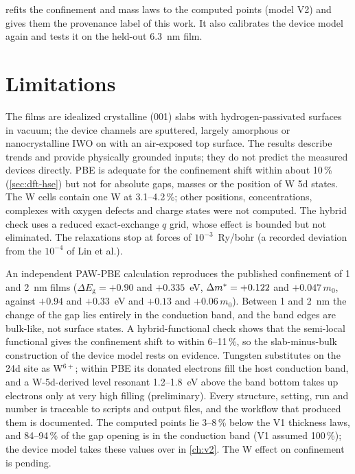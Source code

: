  refits the confinement and mass laws to the computed points (model V2) and gives them the provenance label
of this work. It also calibrates the device model again and tests it on the held-out 6.3~nm film.

\section{Limitations}
\label{sec:dft-limits}

\begin{caveat}
The films are idealized crystalline (001) slabs with hydrogen-passivated surfaces in vacuum; the device channels are
sputtered, largely amorphous or nanocrystalline IWO on \AlO{} with an air-exposed top surface. The results describe
trends and provide physically grounded inputs; they do not predict the measured devices directly. PBE is adequate for
the confinement shift within about 10\,\% (\cref{sec:dft-hse}) but not for absolute gaps, masses or the position of W 5d
states. The W cells contain one W at 3.1--4.2\,\%; other positions, concentrations, complexes with oxygen defects and
charge states were not computed. The hybrid check uses a reduced exact-exchange $q$ grid, whose effect is bounded but
not eliminated. The relaxations stop at forces of $10^{-3}$~Ry/bohr (a recorded deviation from the $10^{-4}$ of Lin et
al.).
\end{caveat}

\begin{keyresult}
An independent PAW-PBE calculation reproduces the published confinement of 1 and 2~nm \InO{} films ($\Delta
E_{\mathrm{g}} = +0.90$ and $+0.335$~eV, $\Delta m^{*} = +0.122$ and $+0.047\,m_0$, against $+0.94$ and $+0.33$~eV and
$+0.13$ and $+0.06\,m_0$). Between 1 and 2~nm the change of the gap lies entirely in the conduction band, and the band
edges are bulk-like, not surface states. A hybrid-functional check shows that the
semi-local functional gives the confinement shift to within 6--11\,\%, so the slab-minus-bulk construction of the device
model rests on evidence. Tungsten substitutes on the 24d site as W$^{6+}$; within PBE its donated electrons
fill the host conduction band, and a W-5d-derived level resonant 1.2--1.8~eV above the band bottom takes up electrons
only at very high filling (preliminary). Every structure, setting, run and number is traceable to scripts and output files,
and the workflow that produced them is documented. The computed points lie 3--8\,\% below the V1 thickness laws, and 84--94\,\%
of the gap opening is in the conduction band (V1 assumed 100\,\%); the device model takes these values over in
\cref{ch:v2}. The W effect on confinement is pending.
\end{keyresult}
